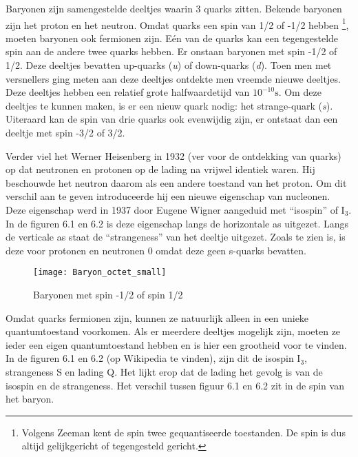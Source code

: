 Baryonen zijn samengestelde deeltjes waarin 3 quarks zitten. Bekende
baryonen zijn het proton en het neutron. Omdat quarks een spin van
1/2 of -1/2 hebben \footnote{Volgens Zeeman kent de spin twee gequantiseerde toestanden. De spin
is dus altijd gelijkgericht of tegengesteld gericht.}, moeten baryonen ook fermionen zijn. Eén van de quarks kan een tegengestelde
spin aan de andere twee quarks hebben. Er onstaan baryonen met spin
-1/2 of 1/2. Deze deeltjes bevatten up-quarks (\emph{u}) of down-quarks
(\emph{d}). Toen men met versnellers ging meten aan deze deeltjes
ontdekte men vreemde nieuwe deeltjes. Deze deeltjes hebben een relatief
grote halfwaardetijd van $10^{-10}\mathrm{s}$. Om deze deeltjes te
kunnen maken, is er een nieuw quark nodig: het strange-quark (\emph{s}).
Uiteraard kan de spin van drie quarks ook evenwijdig zijn, er ontstaat
dan een deeltje met spin -3/2 of 3/2.

Verder viel het Werner Heisenberg in 1932 (ver voor de ontdekking
van quarks) op dat neutronen en protonen op de lading na vrijwel identiek
waren. Hij beschouwde het neutron daarom als een andere toestand van
het proton. Om dit verschil aan te geven introduceerde hij een nieuwe
eigenschap van nucleonen. Deze eigenschap werd in 1937 door Eugene
Wigner aangeduid met ``isospin'' of $\mathrm{I}_{3}$. In de figuren
6.1 en 6.2 is deze eigenschap langs de horizontale as uitgezet. Langs
de verticale as staat de ``strangeness'' van het deeltje uitgezet.
Zoals te zien is, is deze voor protonen en neutronen 0 omdat deze
geen s-quarks bevatten.

\begin{figure}[h]
\noindent \begin{centering}
\texttt{[image: Baryon\_octet\_small]}
\par\end{centering}

\caption{Baryonen met spin -1/2 of spin 1/2}
\end{figure}


Omdat quarks fermionen zijn, kunnen ze natuurlijk alleen in een unieke
quantumtoestand voorkomen. Als er meerdere deeltjes mogelijk zijn,
moeten ze ieder een eigen quantumtoestand hebben en is hier een grootheid
voor te vinden. In de figuren 6.1 en 6.2 (op Wikipedia te vinden),
zijn dit de isospin $\mathrm{I}_{3}$, strangeness S en lading Q.
Het lijkt erop dat de lading het gevolg is van de isospin en de strangeness.
Het verschil tussen figuur 6.1 en 6.2 zit in de spin van het baryon.

